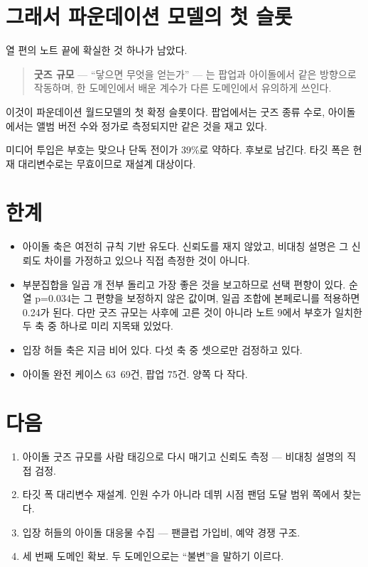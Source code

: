 \documentclass[10pt]{article}
\begin{document}
\section{그래서 파운데이션 모델의 첫 슬롯}

열 편의 노트 끝에 확실한 것 하나가 남았다.

\begin{quote}\fontsize{9.5}{11.5}\selectfont
\textbf{굿즈 규모} --- ``닿으면 무엇을 얻는가'' --- 는 팝업과 아이돌에서 같은
방향으로 작동하며, 한 도메인에서 배운 계수가 다른 도메인에서 유의하게 쓰인다.
\end{quote}

이것이 파운데이션 월드모델의 첫 확정 슬롯이다. 팝업에서는 굿즈 종류 수로, 아이돌에서는
앨범 버전 수와 정가로 측정되지만 같은 것을 재고 있다.

미디어 투입은 부호는 맞으나 단독 전이가 39\%로 약하다. 후보로 남긴다. 타깃 폭은
현재 대리변수로는 무효이므로 재설계 대상이다.

\section{한계}

\begin{itemize}[leftmargin=1.1em,itemsep=0.15em]
\item 아이돌 축은 여전히 규칙 기반 유도다. 신뢰도를 재지 않았고, 비대칭 설명은
      그 신뢰도 차이를 가정하고 있으나 직접 측정한 것이 아니다.
\item 부분집합을 일곱 개 전부 돌리고 가장 좋은 것을 보고하므로 선택 편향이 있다.
      순열 p=0.034는 그 편향을 보정하지 않은 값이며, 일곱 조합에 본페로니를 적용하면
      0.24가 된다. 다만 굿즈 규모는 사후에 고른 것이 아니라 노트 9에서 부호가
      일치한 두 축 중 하나로 미리 지목돼 있었다.
\item 입장 허들 축은 지금 비어 있다. 다섯 축 중 셋으로만 검정하고 있다.
\item 아이돌 완전 케이스 63~69건, 팝업 75건. 양쪽 다 작다.
\end{itemize}

\section{다음}

\begin{enumerate}[leftmargin=1.3em,itemsep=0.15em]
\item 아이돌 굿즈 규모를 사람 태깅으로 다시 매기고 신뢰도 측정 --- 비대칭 설명의
      직접 검정.
\item 타깃 폭 대리변수 재설계. 인원 수가 아니라 데뷔 시점 팬덤 도달 범위 쪽에서 찾는다.
\item 입장 허들의 아이돌 대응물 수집 --- 팬클럽 가입비, 예약 경쟁 구조.
\item 세 번째 도메인 확보. 두 도메인으로는 ``불변''을 말하기 이르다.
\end{enumerate}
\end{document}
